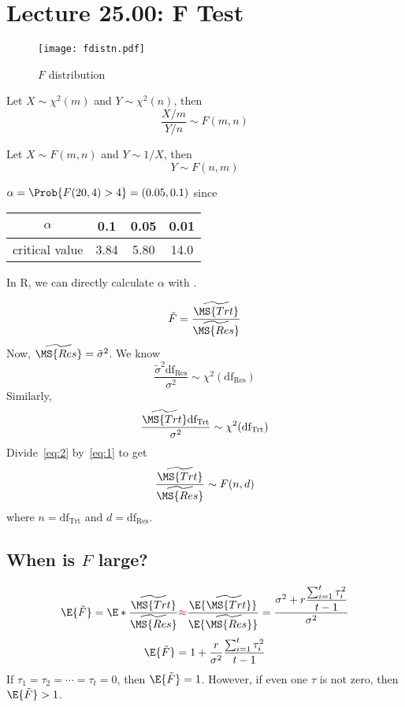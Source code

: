 \section{Lecture 25.00: F Test}
\begin{figure}[!htbp]
    \centering
    \texttt{[image: fdistn.pdf]}
    \caption{$ F $ distribution}
\end{figure}
\begin{Theorem}{}{}
    Let $ X \sim \chi^2(m) $ and $ Y \sim \chi^2(n) $, then
    \[ \frac{X/m}{Y/n} \sim F(m,n) \]
\end{Theorem}
\begin{Theorem}{}{}
    Let $ X \sim F(m,n) $ and $ Y \sim 1/X $, then
    \[ Y \sim F(n,m) \]
\end{Theorem}
\begin{Example}{}{}
    $ \alpha=\Prob{F(20,4)>4}=(0.05,0.1) $ since
    \begin{center}
        \begin{NiceTabular}{c|ccc}
            $\alpha$       & 0.1  & 0.05 & 0.01 \\
            \midrule
            critical value & 3.84 & 5.80 & 14.0
        \end{NiceTabular}
    \end{center}
    In R, we can directly calculate $ \alpha $ with .
\end{Example}
\[ \tilde{F}=\frac{\widetilde{\MS{Trt}}}{\widetilde{\MS{Res}}}  \]
Now, $ \widetilde{\MS{Res}}=\tilde{\sigma}^2 $. We know
\begin{equation}\label{eq:1}
    \frac{\tilde{\sigma}^2\text{df}_\text{Res}}{\sigma^2} \sim \chi^2(\text{df}_{\text{Res}})
\end{equation}
Similarly,
\begin{equation}\label{eq:2}
    \frac{\widetilde{\MS{Trt}}\text{df}_\text{Trt}}{\sigma^2} \sim \chi^2(\text{df}_\text{Trt})
\end{equation}
Divide~\ref{eq:2} by~\ref{eq:1} to get
\[ \frac{\widetilde{\MS{Trt}}}{\widetilde{\MS{Res}}} \sim F(n,d) \]
where $ n=\text{df}_\text{Trt} $ and $ d=\text{df}_\text{Res} $.

\subsection*{When is $ F $ large?}
\[ \E{\tilde{F}}=
    \E*{\frac{\widetilde{\MS{Trt}}}{\widetilde{\MS{Res}}}}{\color{red}\approx}
    \frac{\E{\widetilde{\MS{Trt}}}}{\E{\widetilde{\MS{Res}}}}
    =\frac{\sigma^2+r \dfrac{\sum_{i=1}^t \tau_i^2}{t-1} }{\sigma^2}  \]
\[ \E{\tilde{F}}=1+\frac{r}{\sigma^2} \frac{\sum_{i=1}^t \tau_i^2 }{t-1}  \]
If $ \tau_1=\tau_2=\cdots=\tau_t=0 $, then $ \E{\tilde{F}}=1 $.
However, if even one $ \tau $ is not zero, then $ \E{\tilde{F}}>1 $.

